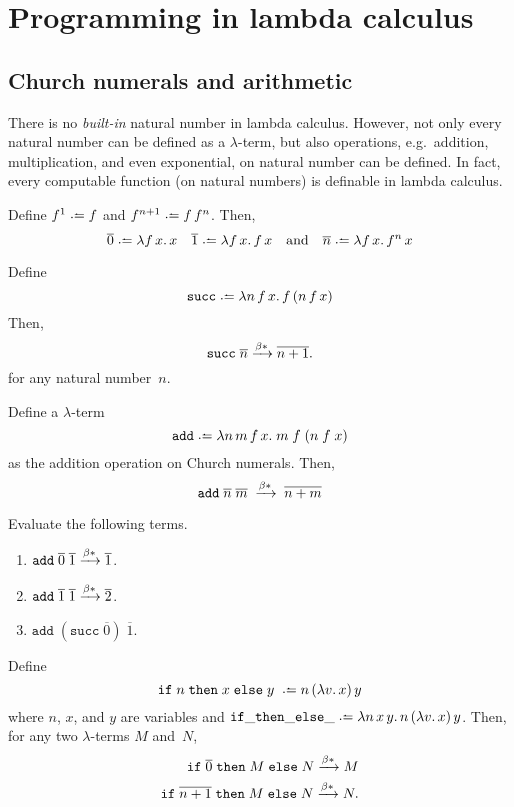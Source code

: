 \section{Programming in lambda calculus}
\subsection{Church numerals and arithmetic}
There is no \emph{built-in} natural number in lambda calculus. However, 
not only every natural number can be defined as a $\lambda$-term, but also 
operations, e.g.\ addition, multiplication, and even exponential, on natural
number can be defined. In fact, every computable function (on natural numbers)
is definable in lambda calculus. 

\begin{definition}
  Define $f^1 \defeq f$ and $f^{n+1} \defeq f\,f^n$. Then, 
  \[
    \overline{0} \defeq \lambda f\,x.\, x
    \quad
    \overline{1} \defeq \lambda f\,x.\, f\,x
    \quad\text{and}\quad
    \overline{n} \defeq \lambda f\,x.\, f^{n}\,x
  \] 
\end{definition}

\begin{definition}[Successor]
  Define
  \[
    \mathtt{succ} \defeq \lambda n\,f\,x.\, f\,(n\,f\,x)
  \]
  Then,
  \[
    \mathtt{succ}\;\overline{n} \xrightarrow{\beta*} \overline{n+1}.
  \]
  for any natural number~$n$.
\end{definition}
\begin{proposition}[Addition]
  Define a $\lambda$-term 
  \[
    \mathtt{add} \defeq \lambda n\,m\,f\,x.\; m\;f\;(n\;f\;x) 
  \]
  as the addition operation on Church numerals.
  Then, 
  \[
    \mathtt{add}\;\overline{n}\;\overline{m}\;
    \xrightarrow{\beta*}\;\overline{n + m}
  \]
\end{proposition}
\begin{example}
  Evaluate the following terms.
  \begin{enumerate}
    \item $\mathtt{add}\;\overline{0}\;\overline{1}
      \xrightarrow{\beta*} \overline{1}$.
    \item $\mathtt{add}\;\overline{1}\;\overline{1}
      \xrightarrow{\beta*} \overline{2}$.
    \item $\mathtt{add}\;(\mathtt{succ}\;\overline{0})\;\overline{1}$.
    \end{enumerate}
\end{example}

\begin{proposition}[Conditional]
  Define 
  \[
    \mathtt{if}\;n\;\mathtt{then}\;x\;\mathtt{else}\;y\; \defeq 
    n\,(\lambda v.\,x)\,y 
  \]
  where $n$, $x$, and $y$ are variables and 
  $\mathtt{if\_then\_else\_} \defeq \lambda n\,x\,y.\,n\,(\lambda v.\, x)\, y$.
  Then, for any two $\lambda$-terms $M$ and~$N$,
  \begin{align*}
    \mathtt{if}\;\overline{0}\;\mathtt{then}\;M\;\mathtt{else}\;N
    \xrightarrow{\beta*} M \\ 
    \mathtt{if}\;\overline{n+1}\;\mathtt{then}\;M\;\mathtt{else}\;N
    \xrightarrow{\beta*} N.
  \end{align*}
\end{proposition}

